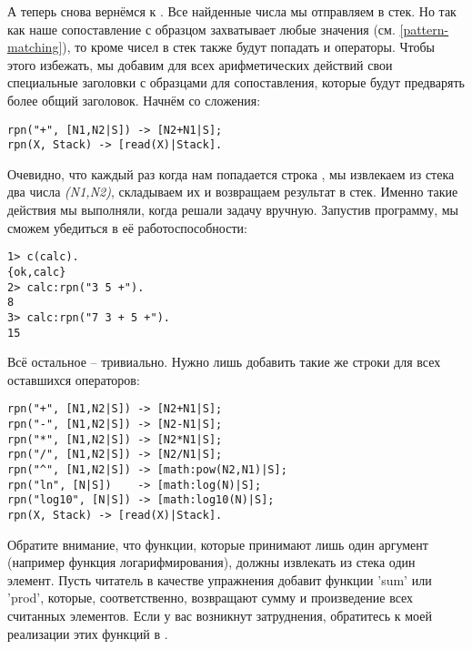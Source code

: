 А теперь снова вернёмся к .
Все найденные числа мы отправляем в стек.
Но так как наше сопоставление с образцом захватывает любые значения (см. \ref{pattern-matching}), то кроме чисел в стек также будут попадать и операторы.
Чтобы этого избежать, мы добавим для всех арифметических действий свои специальные заголовки с образцами для сопоставления, которые будут предварять более общий заголовок.
Начнём со сложения:
\begin{lstlisting}[style=erlang]
rpn("+", [N1,N2|S]) -> [N2+N1|S];
rpn(X, Stack) -> [read(X)|Stack].
\end{lstlisting}

Очевидно, что каждый раз когда нам попадается строка , мы извлекаем из стека два числа \emph{(N1,N2)}, складываем их и возвращаем результат в стек.
Именно такие действия мы выполняли, когда решали задачу вручную.
Запустив программу, мы сможем убедиться в её работоспособности:
\begin{lstlisting}[style=erlang]
1> c(calc).
{ok,calc}
2> calc:rpn("3 5 +").
8
3> calc:rpn("7 3 + 5 +").
15
\end{lstlisting}

Всё остальное \--- тривиально.
Нужно  лишь добавить такие же строки для всех оставшихся  операторов:
\begin{lstlisting}[style=erlang]
rpn("+", [N1,N2|S]) -> [N2+N1|S];
rpn("-", [N1,N2|S]) -> [N2-N1|S];
rpn("*", [N1,N2|S]) -> [N2*N1|S];
rpn("/", [N1,N2|S]) -> [N2/N1|S];
rpn("^", [N1,N2|S]) -> [math:pow(N2,N1)|S];
rpn("ln", [N|S])    -> [math:log(N)|S];
rpn("log10", [N|S]) -> [math:log10(N)|S];
rpn(X, Stack) -> [read(X)|Stack].
\end{lstlisting}

Обратите внимание, что функции, которые принимают лишь один аргумент (например функция логарифмирования), должны извлекать из стека один элемент.
Пусть читатель в качестве упражнения добавит функции 'sum' или 'prod', которые, соответственно, возвращают сумму и произведение всех считанных элементов.
Если у вас возникнут затруднения, обратитесь к моей реализации этих функций в .

